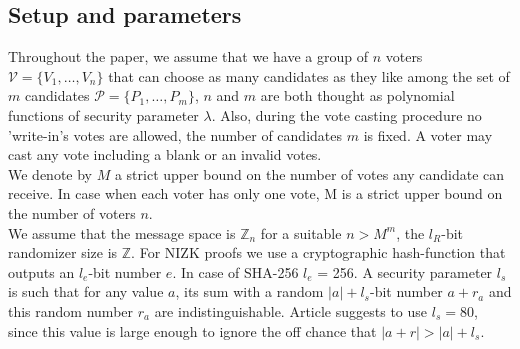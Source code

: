 \documentclass[12pt]{article}
\begin{document}
\subsection{Setup and parameters}
Throughout the paper, we assume that we have a group of $n$ voters $\mathcal{V} = \{V_1,\dots,V_n\}$ that can choose as many candidates as they like among the set of $m$ candidates $\mathcal{P} = \{P_1,\dots,P_m\}$, $n$ and $m$ are both thought as polynomial functions of security parameter $\lambda$. Also, during the vote casting procedure no 'write-in's votes are allowed, the number of candidates $m$ is fixed. A voter may cast any vote including a blank or an invalid votes. \\

We denote by $M$ a strict upper bound on the number of votes any candidate can receive. In case when each voter has only one vote, M is a strict upper bound on the number of voters $n$.\\ 

We assume that the message space is $\mathbb{Z}_n$ for a suitable $n > M^m$, the $l_R$-bit randomizer size is  $\mathbb{Z}$. For NIZK proofs we use a cryptographic hash-function that outputs an $l_e$-bit number $e$. In case of SHA-256  $l_e$ = 256. A security parameter $l_s$ is such that for any value $a$, its sum with a random $|a| + l_s$-bit number $a + r_a$ and this random number $r_a$ are indistinguishable. Article \cite{Groth2005} suggests to use $l_s = 80$, since this value is large enough to ignore the off chance that $|a+r| > |a|+l_s$.
\end{document}

